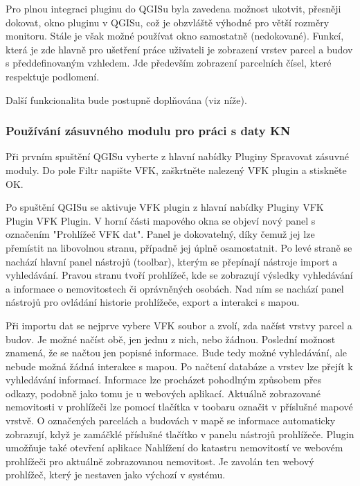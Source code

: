 \documentclass[a4paper,10pt]{article}
\begin{document}
Pro plnou integraci pluginu do QGISu byla zavedena možnost ukotvit, přesněji dokovat, okno pluginu v QGISu, což je obzvláště výhodné pro větší rozměry monitoru.
Stále je však možné používat okno samostatně (nedokované).
Funkcí, která je zde hlavně pro ušetření práce uživateli je zobrazení vrstev parcel a budov s předdefinovaným vzhledem.
Jde především zobrazení parcelních čísel, které respektuje podlomení.

Další funkcionalita bude postupně doplňována (viz níže).


\subsubsection{Používání zásuvného modulu pro práci s daty KN}
Při prvním spuštění QGISu vyberte z hlavní nabídky Pluginy \textrightarrow{} Spravovat zásuvné moduly.
Do pole Filtr napište VFK, zaškrtněte nalezený VFK plugin a stiskněte OK.

Po spuštění QGISu se aktivuje VFK plugin z hlavní nabídky Pluginy \textrightarrow{} VFK Plugin \textrightarrow{} VFK Plugin.
V horní části mapového okna se objeví nový panel s označením "Prohlížeč VFK dat".
Panel je dokovatelný, díky čemuž jej lze přemístit na libovolnou stranu, případně jej úplně osamostatnit.
Po levé straně se nachází hlavní panel nástrojů (toolbar), kterým se přepínají nástroje import a vyhledávání.
Pravou stranu tvoří prohlížeč, kde se zobrazují výsledky vyhledávání a informace o nemovitostech či oprávněných osobách.
Nad ním se nachází panel nástrojů pro ovládání historie prohlížeče, export a interakci s mapou.

Při importu dat se nejprve vybere VFK soubor a zvolí, zda načíst vrstvy parcel a budov.
Je možné načíst obě, jen jednu z nich, nebo žádnou.
Poslední možnost znamená, že se načtou jen popisné informace.
Bude tedy možné vyhledávání, ale nebude možná žádná interakce s mapou.
Po načtení databáze a vrstev lze přejít k vyhledávání informací.
Informace lze procházet pohodlným způsobem přes odkazy, podobně jako tomu je u webových aplikací.
Aktuálně zobrazované nemovitosti v prohlížeči lze pomocí tlačítka v toobaru označit v příslušné mapové vrstvě.
O označených parcelách a budovách v mapě se informace automaticky zobrazují, když je zamáčklé příslušné tlačítko v panelu nástrojů prohlížeče.
Plugin umožňuje také otevření aplikace Nahlížení do katastru nemovitostí ve webovém prohlížeči pro aktuálně zobrazovanou nemovitost.
Je zavolán ten webový prohlížeč, který je nestaven jako výchozí v systému.
\end{document}
